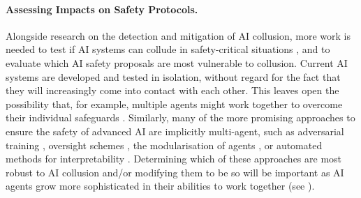 \paragraph{Assessing Impacts on Safety Protocols.}
Alongside research on the detection and mitigation of AI collusion, more work is needed to test if AI systems can collude in safety-critical situations \citep{Shevlane2023}, and to evaluate which AI safety proposals are most vulnerable to collusion.
Current AI systems are developed and tested in isolation, without regard for the fact that they will increasingly come into contact with each other.
This leaves open the possibility that, for example, multiple agents might work together to overcome their individual safeguards \citep[see also ]{Jones2024}.
Similarly, many of the more promising approaches to ensure the safety of advanced AI are implicitly multi-agent, such as adversarial training \citep{Huang2011,Ziegler2022,Perez2022}, oversight schemes \citep{Irving2018,Christiano2018a,elk_report_2021,Greenblatt2023,Leike2018}, the modularisation of agents \citep{Drexler2019,Dalrymple2024}, or automated methods for interpretability \citep{bills2023language,Schwettmann2023}.
Determining which of these approaches are most robust to AI collusion and/or modifying them to be so will be important as AI agents grow more sophisticated in their abilities to work together (see ).





